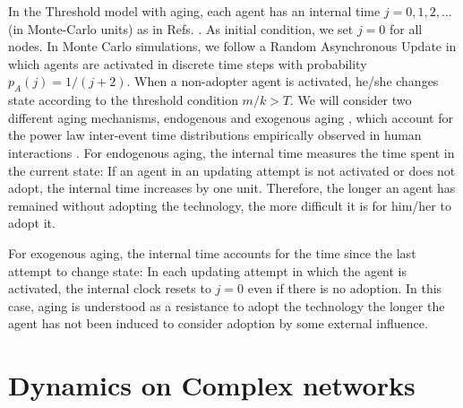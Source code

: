 In the Threshold model with aging, each agent has an internal time $j = 0,1,2,...$  (in Monte-Carlo units) as in Refs. \cite{fernandez-gracia-2013,artime-2018,peralta-2020C,peralta-2020A,chen-2020,fernandez-gracia-2011,perez-2016,stark-2008,Abella}.  As initial condition, we set $j = 0$ for all nodes. In Monte Carlo simulations, we follow a Random Asynchronous Update in which agents are activated in discrete time steps with probability $p_{A} (j) = 1/(j+2)$. When a non-adopter agent is activated, he/she changes state according to the threshold condition $m/k > T$. We will consider two different aging mechanisms, endogenous and exogenous aging \cite{fernandez-gracia-2011}, which account for the power law inter-event time distributions empirically observed in human interactions \cite{artime-2017}. For endogenous aging,  the internal time measures the time spent in the current state: If an agent in an updating attempt is not activated or does not adopt, the internal time increases by one unit. Therefore, the longer an agent has remained without adopting the technology, the more difficult it is for him/her to adopt it. 

For exogenous aging, the internal time accounts for the time since the last attempt to change state: In each updating attempt in which the agent is activated, the internal clock resets to $j = 0$ even if there is no adoption. In this case, aging is understood as a resistance to adopt the technology the longer the agent has not been induced to consider adoption by some external influence.  


\section{\label{sec:Complex networks} Dynamics on Complex networks}

